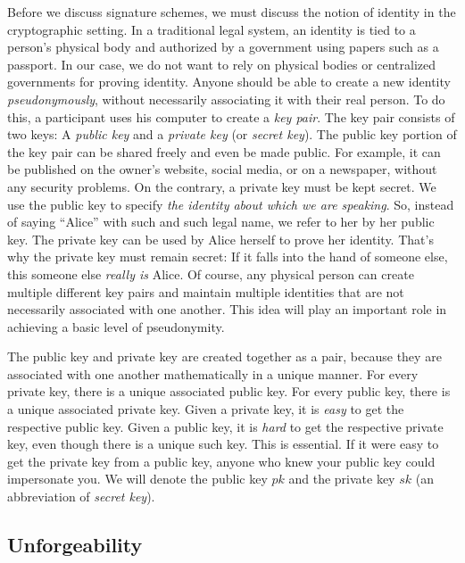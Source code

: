 Before we discuss signature schemes, we must discuss the notion of identity in the cryptographic
setting. In a traditional legal system, an identity is tied to a person's physical body
and authorized by a government using papers such as a passport. In our case, we do not want
to rely on physical bodies or centralized governments for proving identity. Anyone should be
able to create a new identity \emph{pseudonymously}, without necessarily associating it with
their real person. To do this, a participant uses his computer to create a \emph{key pair}.
The key pair consists of two keys: A \emph{public key} and a \emph{private key}
(or \emph{secret key}). The public key portion of the key pair can be shared freely and even
be made public. For example, it can be published on the owner's website, social media, or on
a newspaper, without any security problems. On the contrary, a private key must be kept secret.
We use the public key to specify \emph{the identity about which we are speaking}. So, instead
of saying ``Alice'' with such and such legal name, we refer to her by her public
key. The private key can be used by Alice herself to prove her identity. That's why the
private key must remain secret: If it falls into the hand of someone else, this someone
else \emph{really is} Alice. Of course, any physical person can create multiple different
key pairs and maintain multiple identities that are not necessarily associated with one
another. This idea will play an important role in achieving a basic level of pseudonymity.

The public key and private key are created together as a pair, because they are associated
with one another mathematically in a unique manner. For every private key, there is a unique
associated public key. For every public key, there is a unique associated private key.
Given a private key, it is \emph{easy} to get the respective public key. Given a public
key, it is \emph{hard} to get the respective private key, even though there is a unique
such key. This is essential. If it were easy to get the private key from a public key,
anyone who knew your public key could impersonate you. We will denote the public key
$pk$ and the private key $sk$ (an abbreviation of \emph{secret key}).

\subsection*{Unforgeability}

